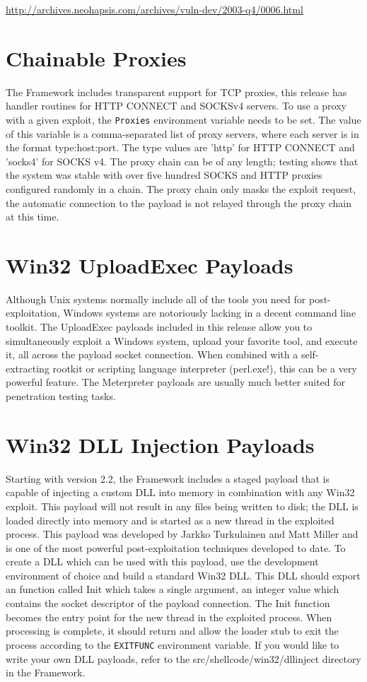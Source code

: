 \documentclass{report}
\begin{document}
\url{http://archives.neohapsis.com/archives/vuln-dev/2003-q4/0006.html}



\section{Chainable Proxies}
\par
The Framework includes transparent support for TCP proxies, this release has
handler routines for HTTP CONNECT and SOCKSv4 servers. To use a proxy with a
given exploit, the \texttt{Proxies} environment variable needs to be set. The value of
this variable is a comma-separated list of proxy servers, where each server is
in the format type:host:port. The type values are 'http' for HTTP CONNECT and
'socks4' for SOCKS v4. The proxy chain can be of any length; testing shows that
the system was stable with over five hundred SOCKS and HTTP proxies configured
randomly in a chain. The proxy chain only masks the exploit request, the
automatic connection to the payload is not relayed through the proxy chain at
this time. 

\section{Win32 UploadExec Payloads}
\par
Although Unix systems normally include all of the tools you need for
post-exploitation, Windows systems are notoriously lacking in a decent command
line toolkit. The UploadExec payloads included in this release allow you to
simultaneously exploit a Windows system, upload your favorite tool, and execute
it, all across the payload socket connection. When combined with a
self-extracting rootkit or scripting language interpreter (perl.exe!), this can
be a very powerful feature. The Meterpreter payloads are usually much better
suited for penetration testing tasks.  

\section{Win32 DLL Injection Payloads}
\par
Starting with version 2.2, the Framework includes a staged payload that is
capable of injecting a custom DLL into memory in combination with any Win32
exploit. This payload will not result in any files being written to disk; the
DLL is loaded directly into memory and is started as a new thread in the
exploited process. This payload was developed by Jarkko Turkulainen and Matt
Miller and is one of the most powerful post-exploitation techniques developed to
date. To create a DLL which can be used with this payload, use the development
environment of choice and build a standard Win32 DLL. This DLL should export an
function called Init which takes a single argument, an integer value which
contains the socket descriptor of the payload connection. The Init function
becomes the entry point for the new thread in the exploited process. When
processing is complete, it should return and allow the loader stub to exit the
process according to the \texttt{EXITFUNC} environment variable. If you would like to
write your own DLL payloads, refer to the src/shellcode/win32/dllinject
directory in the Framework. 
\end{document}

